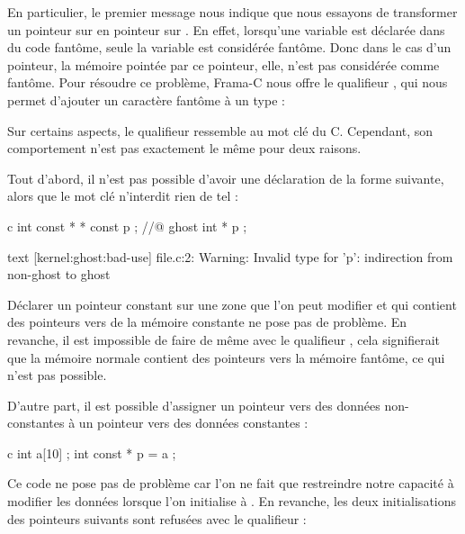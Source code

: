 En particulier, le premier message nous indique que nous essayons de transformer
un pointeur sur  en pointeur sur
. En effet, lorsqu'une variable est déclarée dans du code fantôme,
seule la variable est considérée fantôme. Donc dans le cas d'un pointeur, la mémoire
pointée par ce pointeur, elle, n'est pas considérée comme fantôme. Pour résoudre
ce problème, Frama-C nous offre le qualifieur ,
qui nous permet d'ajouter un caractère fantôme à un type :




Sur certains aspects, le qualifieur  ressemble
au mot clé  du C. Cependant, son comportement n'est pas
exactement le même pour deux raisons.


Tout d'abord, il n'est pas possible d'avoir une déclaration de la forme suivante,
alors que le mot clé  n'interdit rien de tel :


\begin{CodeBlock}{c}
int const * * const p ;
//@ ghost int \ghost * * p ;
\end{CodeBlock}


\begin{CodeBlock}{text}
[kernel:ghost:bad-use] file.c:2: Warning:
  Invalid type for 'p': indirection from non-ghost to ghost
\end{CodeBlock}



Déclarer un pointeur constant sur une zone que l'on peut modifier et qui contient
des pointeurs vers de la mémoire constante ne pose pas de problème. En revanche,
il est impossible de faire de même avec le qualifieur
, cela signifierait que la mémoire normale
contient des pointeurs vers la mémoire fantôme, ce qui n'est pas possible.


D'autre part, il est possible d'assigner un pointeur
vers des données non-constantes à un pointeur vers des données constantes :


\begin{CodeBlock}{c}
int a[10] ;
int const * p = a ;
\end{CodeBlock}


Ce code ne pose pas de problème car l'on ne fait que restreindre notre capacité
à modifier les données lorsque l'on initialise  à .
En revanche, les deux initialisations des pointeurs suivants sont refusées
avec le qualifieur  :


